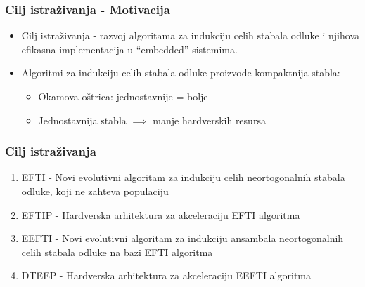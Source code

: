 \documentclass{beamer}
\begin{document}
\begin{frame}
\frametitle{Cilj istraživanja - Motivacija}
\begin{itemize}
\setlength{\itemsep}{\fill}
\item Cilj istraživanja - razvoj algoritama za indukciju celih stabala
odluke i njihova efikasna implementacija u “embedded” sistemima.
\item Algoritmi za indukciju celih stabala odluke proizvode kompaktnija
stabla:
\begin{itemize}
\item Okamova oštrica: jednostavnije = bolje
\vspace{1em}
\item Jednostavnija stabla $\implies$ manje hardverskih resursa
\end{itemize}
\end{itemize}
\end{frame}


\begin{frame}
\frametitle{Cilj istraživanja}
\begin{enumerate}
\setlength{\itemsep}{\fill}
\item EFTI - Novi evolutivni algoritam za indukciju celih neortogonalnih stabala
odluke, koji ne zahteva populaciju
\item EFTIP - Hardverska arhitektura za akceleraciju EFTI algoritma
\item EEFTI - Novi evolutivni algoritam za indukciju ansambala neortogonalnih celih
stabala odluke na bazi EFTI algoritma
\item DTEEP - Hardverska arhitektura za akceleraciju EEFTI algoritma
\end{enumerate}
\end{frame}

\end{document}
